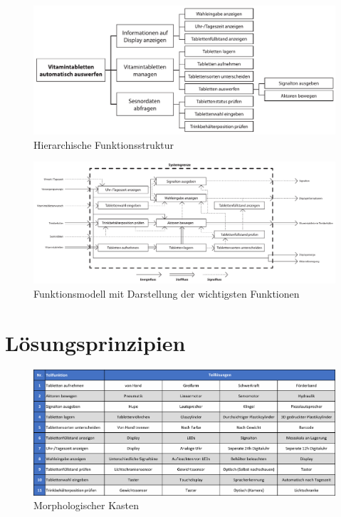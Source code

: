 \begin{figure}[H]
	\centering
	\includegraphics[width=1.0\linewidth]{chapter/Bilder/funktionsstruktur_hierarchisch}
	\caption{Hierarchische Funktionsstruktur}
	\label{fig:funktionsstrukturhierarchisch}
\end{figure}

\begin{figure}[H]
	\centering
	\includegraphics[angle=90, height=0.9\textheight]{chapter/Bilder/funktionsmodell}
	\caption{Funktionsmodell mit Darstellung der  wichtigsten Funktionen}
	\label{fig:funktionsmodell}
\end{figure}

\newpage
\section{Lösungsprinzipien}

\begin{figure}[H]
	\centering
	\includegraphics[width=1.0\linewidth]{chapter/Bilder/morphkasten}
	\caption{Morphologischer Kasten}
	\label{fig:morphkasten}
\end{figure}

